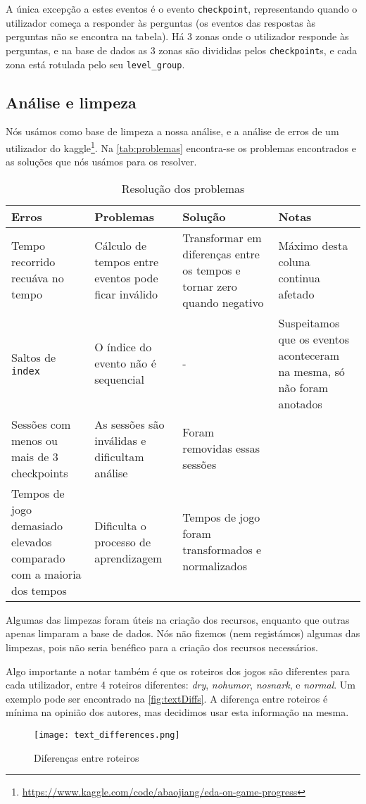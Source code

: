 \documentclass[justified, 11pt]{scrartcl}
\begin{document}
  A única excepção a estes eventos é o evento \texttt{checkpoint}, representando quando o utilizador começa a responder às perguntas (os eventos das respostas às perguntas não se encontra na tabela). Há 3 zonas onde o utilizador responde às perguntas, e na base de dados as 3 zonas são divididas pelos \texttt{checkpoint}s, e cada zona está rotulada pelo seu \texttt{level\_group}.

  \subsection{Análise e limpeza}
  Nós usámos como base de limpeza a nossa análise, e a análise de erros de um utilizador do kaggle\footnote{\url{https://www.kaggle.com/code/abaojiang/eda-on-game-progress}}. Na \autoref{tab:problemas} encontra-se os problemas encontrados e as soluções que nós usámos para os resolver.
  \begin{table}[htb]
    \centering
    \caption{Resolução dos problemas}
    \label{tab:problemas}
    \setlength{\extrarowheight}{7pt}
    \begin{tabulary}{\textwidth}{ L L L L }
      \toprule
      Erros & Problemas & Solução & Notas \\
      \midrule
      Tempo recorrido recuáva no tempo & Cálculo de tempos entre eventos pode ficar inválido & Transformar em diferenças entre os tempos e tornar zero quando negativo & Máximo desta coluna continua afetado \\
      Saltos de \texttt{index} & O índice do evento não é sequencial & - & Suspeitamos que os eventos aconteceram na mesma, só não foram anotados\\
      Sessões com menos ou mais de 3 checkpoints & As sessões são inválidas e dificultam análise & Foram removidas essas sessões & \\
      Tempos de jogo demasiado elevados comparado com a maioria dos tempos & Dificulta o processo de aprendizagem & Tempos de jogo foram transformados e normalizados &
    \end{tabulary}
  \end{table}

  Algumas das limpezas foram úteis na criação dos recursos, enquanto que outras apenas limparam a base de dados. Nós não fizemos (nem registámos) algumas das limpezas, pois não seria benéfico para a criação dos recursos necessários.

  Algo importante a notar também é que os roteiros dos jogos são diferentes para cada utilizador, entre 4 roteiros diferentes: \textit{dry}, \textit{nohumor}, \textit{nosnark}, e \textit{normal}. Um exemplo pode ser encontrado na \autoref{fig:textDiffs}. A diferença entre roteiros é mínima na opinião dos autores, mas decidimos usar esta informação na mesma.
  \begin{figure}[H]
    \centering
    \texttt{[image: text\_differences.png]}
    \caption{Diferenças entre roteiros}
    \label{fig:textDiffs}
  \end{figure}
\end{document}
